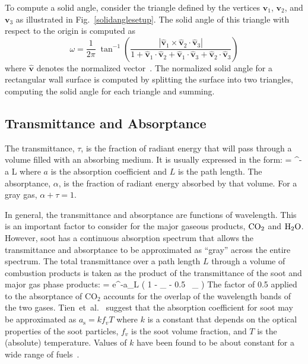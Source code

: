 \documentclass[12pt,twoside]{book}
\begin{document}
To compute a solid angle, consider the triangle defined by the vertices $\mathbf{v}_1$, $\mathbf{v}_2$, and $\mathbf{v}_3$ as illustrated in Fig.~\ref{solidanglesetup}. The solid angle of this triangle with respect to the origin is computed as
\begin{equation*}
\omega = \frac{1}{2\pi} \; \tan^{-1} \left( \frac{|\hat{\mathbf v}_1\times \hat{\mathbf v}_2\cdot \hat{\mathbf v}_3|}
   {1+\hat{\mathbf v}_1\cdot \hat{\mathbf v}_2+\hat{\mathbf v}_1\cdot \hat{\mathbf v}_3+\hat{\mathbf v}_2\cdot \hat{\mathbf v}_3} \right)
\end{equation*}
where $\hat{\mathbf v}$ denotes the normalized vector~\cite{vanOosterom:1983}. The normalized solid angle for a rectangular wall surface is computed by splitting the surface into two triangles, computing the solid angle for each triangle and summing.

\subsection{Transmittance and Absorptance}

The transmittance, $\tau$, is the fraction of radiant energy that will pass through a volume filled with an absorbing medium. It is usually expressed in the form:
\be
   \tau = {}^{-a L}
\ee
where $a$ is the absorption coefficient and $L$ is the path length. The absorptance, $\alpha$, is the fraction of radiant energy absorbed by that volume. For a gray gas, $\alpha + \tau = 1$.

In general, the transmittance and absorptance are functions of wavelength. This is an important factor to consider for the major gaseous products, $\textnormal{CO}_2$  and $\textnormal{H}_2 \textnormal{O}$. However, soot has a continuous absorption spectrum that allows the transmittance and absorptance to be approximated as ``gray'' \cite{SiegelandHowell:1981} across the entire spectrum. The total transmittance over a path length $L$ through a volume of combustion products is taken as the product of the transmittance of the soot and major gas phase products:
\be
   \tau = e^{-a_{}L} \left( 1 - \alpha_{} - 0.5 \, \alpha_{} \right)
\ee
The factor of 0.5 applied to the absorptance of CO$_2$ accounts for the overlap of the wavelength bands of the two gases. Tien~et~al.~\cite{Tien:2002} suggest that the absorption coefficient for soot may be approximated as $a_{\mathrm{s}} = k f_v T$ where $k$ is a constant that depends on the optical properties of the soot particles, $f_v$ is the soot volume fraction, and $T$ is the (absolute) temperature. Values of $k$ have been found to be about constant for a wide range of fuels~\cite{Tien:1978}.
\end{document}

